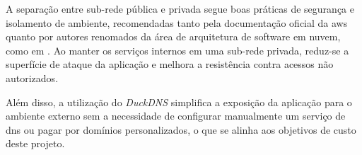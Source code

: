A separação entre sub-rede pública e privada segue boas práticas de segurança e isolamento de ambiente, recomendadas tanto pela documentação oficial da \gls{aws} quanto por autores renomados da área de arquitetura de software em nuvem, como em \cite{AWSBestPractices}. Ao manter os serviços internos em uma sub-rede privada, reduz-se a superfície de ataque da aplicação e melhora a resistência contra acessos não autorizados.

Além disso, a utilização do \emph{DuckDNS} simplifica a exposição da aplicação para o ambiente externo sem a necessidade de configurar manualmente um serviço de \gls{dns} ou pagar por domínios personalizados, o que se alinha aos objetivos de custo deste projeto.